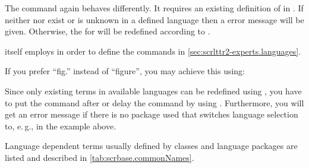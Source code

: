 The command  again behaves differently. It requires an
existing definition of  in .  If neither
 nor  exist or  is unknown in a
defined language then a error message will be given. Otherwise, the
 for  will be redefined according to
.

\KOMAScript{} itself employs  in order to define the
commands in \autoref{sec:scrlttr2-experts.languages}.

\begin{Example}
  If you prefer ``fig.'' instead of ``figure'', you may achieve this using:
\begin{lstcode}
\end{lstcode}
\end{Example}
  
Since only existing terms in available languages can be
redefined using , you have to put the command after
 or delay the command by using
. Furthermore, you will get an error message if there
is no package used that switches language selection to, e.\,g.,
 in the example above.

Language dependent terms usually defined by classes and language
packages are listed and described in \autoref{tab:scrbase.commonNames}.

